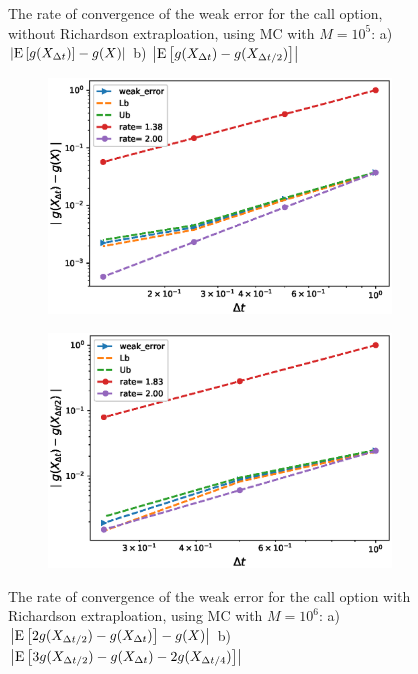 \documentclass[11pt]{article}
\newcommand{\expt}[1]{\mathrm{E}\left[#1\right]}
\begin{document}
\begin{figure}[h!]
	\caption{The rate of convergence of the weak error for the call option, without Richardson extraploation, using MC with $M=10^5$: a) $\abs{\expt{g(X_{\Delta t})}-g(X)}$  b) $\abs{\expt{g(X_{\Delta t})-g(X_{\Delta t/2})}}$ }
	\label{fig:Weak_rate_call_without_rich}
\end{figure}
\begin{figure}[h!]
	\centering
	\begin{subfigure}{.4\textwidth}
		\centering
		\includegraphics[width=1\linewidth]{./figures/weak_error_rates_call/Beta_10/with_richardson/weak_convergence_order_call_richardson_relative_M_10_6}
		\caption{}
		\label{fig:sub3}
	\end{subfigure}%
	\begin{subfigure}{.4\textwidth}
		\centering
		\includegraphics[width=1\linewidth]{./figures/weak_error_rates_call/Beta_10/with_richardson/weak_convergence_order_differences_call_richardson_relative_M_10_6}
		\caption{}
		\label{fig:sub4}
	\end{subfigure}
	
	\caption{The rate of convergence of the weak error for the  call option with Richardson extraploation, using MC with $M=10^6$: a) $\abs{\expt{2 g(X_{\Delta t/2}) -g(X_{\Delta t})}-g(X)}$  b) $\abs{\expt{3 g(X_{\Delta t/2})-g(X_{\Delta t})-2 g(X_{\Delta t/4})}}$ }
	\label{fig:fig:Weak_rate_call_with_rich}
\end{figure}
\end{document}
